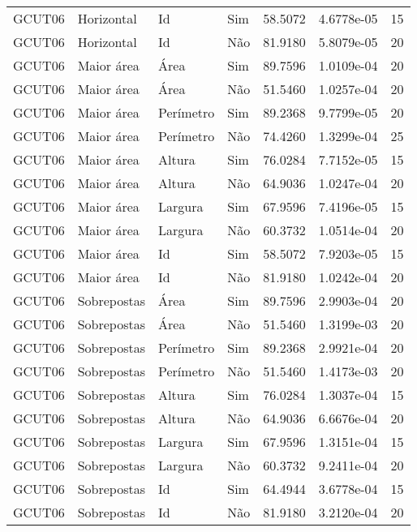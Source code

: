 \begin{tabular}{llllrrr}
    GCUT06    & Horizontal  & Id        & Sim         & 58.5072      & 4.6778e-05 & 15       \\
    GCUT06    & Horizontal  & Id        & Não         & 81.9180      & 5.8079e-05 & 20       \\
    GCUT06    & Maior área  & Área      & Sim         & 89.7596      & 1.0109e-04 & 20       \\
    GCUT06    & Maior área  & Área      & Não         & 51.5460      & 1.0257e-04 & 20       \\
    GCUT06    & Maior área  & Perímetro & Sim         & 89.2368      & 9.7799e-05 & 20       \\
    GCUT06    & Maior área  & Perímetro & Não         & 74.4260      & 1.3299e-04 & 25       \\
    GCUT06    & Maior área  & Altura    & Sim         & 76.0284      & 7.7152e-05 & 15       \\
    GCUT06    & Maior área  & Altura    & Não         & 64.9036      & 1.0247e-04 & 20       \\
    GCUT06    & Maior área  & Largura   & Sim         & 67.9596      & 7.4196e-05 & 15       \\
    GCUT06    & Maior área  & Largura   & Não         & 60.3732      & 1.0514e-04 & 20       \\
    GCUT06    & Maior área  & Id        & Sim         & 58.5072      & 7.9203e-05 & 15       \\
    GCUT06    & Maior área  & Id        & Não         & 81.9180      & 1.0242e-04 & 20       \\
    GCUT06    & Sobrepostas & Área      & Sim         & 89.7596      & 2.9903e-04 & 20       \\
    GCUT06    & Sobrepostas & Área      & Não         & 51.5460      & 1.3199e-03 & 20       \\
    GCUT06    & Sobrepostas & Perímetro & Sim         & 89.2368      & 2.9921e-04 & 20       \\
    GCUT06    & Sobrepostas & Perímetro & Não         & 51.5460      & 1.4173e-03 & 20       \\
    GCUT06    & Sobrepostas & Altura    & Sim         & 76.0284      & 1.3037e-04 & 15       \\
    GCUT06    & Sobrepostas & Altura    & Não         & 64.9036      & 6.6676e-04 & 20       \\
    GCUT06    & Sobrepostas & Largura   & Sim         & 67.9596      & 1.3151e-04 & 15       \\
    GCUT06    & Sobrepostas & Largura   & Não         & 60.3732      & 9.2411e-04 & 20       \\
    GCUT06    & Sobrepostas & Id        & Sim         & 64.4944      & 3.6778e-04 & 15       \\
    GCUT06    & Sobrepostas & Id        & Não         & 81.9180      & 3.2120e-04 & 20       \\
    \hline
\end{tabular}